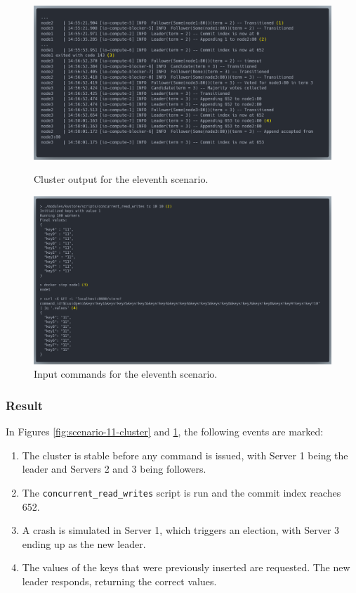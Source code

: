 \begin{figure}[!ht]
\centering
\includegraphics[width=500pt]{images/scenario_11_cluster.png}
\caption{Cluster output for the eleventh scenario.}
\label{fig:scenario-11-cluster}
\includegraphics[width=500pt]{images/scenario_11_commands.png}
\caption{Input commands for the eleventh scenario.}
\label{fig:scenario-11-commands}
\end{figure}

\subsubsection{Result}
In Figures \ref{fig:scenario-11-cluster} and \ref{fig:scenario-11-commands}, the following events are marked:
\begin{enumerate}
    \item The cluster is stable before any command is issued, with Server 1 being the leader and Servers 2 and 3 being followers.
    \item The \lstinline{concurrent_read_writes} script is run and the commit index reaches 652.
    \item A crash is simulated in Server 1, which triggers an election, with Server 3 ending up as the new leader.
    \item The values of the keys that were previously inserted are requested. The new leader responds, returning the correct values.
\end{enumerate}

